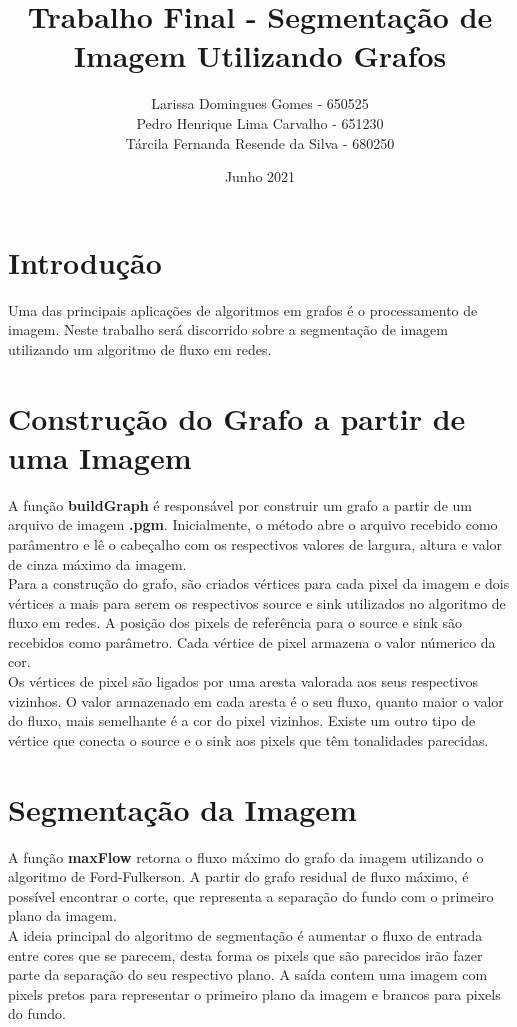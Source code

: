 \documentclass{article}
\title{Trabalho Final - Segmentação de Imagem Utilizando Grafos}
\author{Larissa Domingues Gomes - 650525 \\
Pedro Henrique Lima Carvalho - 651230\\
Tárcila Fernanda Resende da Silva - 680250}
\date{Junho 2021}
\begin{document}
\maketitle

\section{Introdução}
\quad Uma das principais aplicações de algoritmos em grafos é o processamento de imagem. Neste trabalho será discorrido sobre a segmentação de imagem utilizando um algoritmo de fluxo em redes.\\

\section{Construção do Grafo a partir de uma Imagem}
\quad A função \textbf{buildGraph} é responsável por construir um grafo a partir de um arquivo de imagem \textbf{.pgm}. Inicialmente, o método abre o arquivo recebido como parâmentro e lê o cabeçalho com os respectivos valores de largura, altura e valor de cinza máximo da imagem.\\

 Para a construção do grafo, são criados vértices para cada pixel da imagem e dois vértices a mais para serem os respectivos source e sink utilizados no algoritmo de fluxo em redes. A posição dos pixels de referência para o source e sink são recebidos como parâmetro. Cada vértice de pixel armazena o valor númerico da cor.\\
 
 Os vértices de pixel são ligados por uma aresta valorada aos seus respectivos vizinhos. O valor armazenado em cada aresta é o seu fluxo, quanto maior o valor do fluxo, mais semelhante é a cor do pixel vizinhos. Existe um outro tipo de vértice que conecta o source e o sink aos pixels que têm  tonalidades parecidas.
 
 \section{Segmentação da Imagem}
\quad A função \textbf{maxFlow} retorna o fluxo máximo do grafo da imagem utilizando o algoritmo de Ford-Fulkerson. A partir do grafo residual de fluxo máximo, é possível encontrar o corte, que representa a separação do fundo com o primeiro plano da imagem.\\

A ideia principal do algoritmo de segmentação é aumentar o fluxo de entrada entre cores que se parecem, desta forma os pixels que são parecidos irão fazer parte da separação do seu respectivo plano. A saída contem uma imagem com pixels pretos para representar o primeiro plano da imagem e brancos para pixels do fundo.
\end{document}
